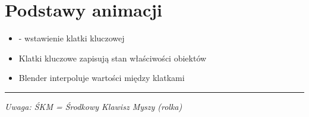 \section{Podstawy animacji}
\begin{itemize}[itemsep=2pt]
    \item {} - wstawienie klatki kluczowej
    \item Klatki kluczowe zapisują stan właściwości obiektów
    \item Blender interpoluje wartości między klatkami
\end{itemize}

\vspace{1em}
\hrule
\vspace{0.5em}
\textit{Uwaga: ŚKM = Środkowy Klawisz Myszy (rolka)}


